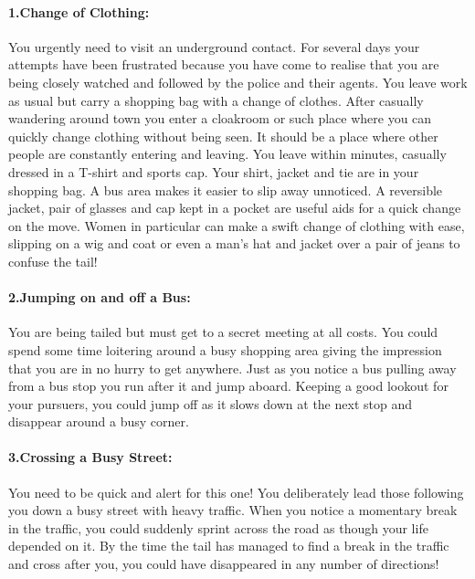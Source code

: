 \paragraph{1.Change of Clothing:}

You urgently need to visit an underground contact. For several days your
attempts have been frustrated because you have come to realise that you
are being closely watched and followed by the police and their agents.
You leave work as usual but carry a shopping bag with a change of
clothes. After casually wandering around town you enter a cloakroom or
such place where you can quickly change clothing without being seen. It
should be a place where other people are constantly entering and
leaving. You leave within minutes, casually dressed in a T-shirt and
sports cap. Your shirt, jacket and tie are in your shopping bag. A bus
area makes it easier to slip away unnoticed. A reversible jacket, pair
of glasses and cap kept in a pocket are useful aids for a quick change
on the move. Women in particular can make a swift change of clothing
with ease, slipping on a wig and coat or even a man's hat and jacket
over a pair of jeans to confuse the tail!

\paragraph{2.Jumping on and off a Bus:}

You are being tailed but must get to a secret meeting at all costs. You
could spend some time loitering around a busy shopping area giving the
impression that you are in no hurry to get anywhere. Just as you notice
a bus pulling away from a bus stop you run after it and jump aboard.
Keeping a good lookout for your pursuers, you could jump off as it slows
down at the next stop and disappear around a busy corner.

\paragraph{3.Crossing a Busy Street:}

You need to be quick and alert for this one! You deliberately lead those
following you down a busy street with heavy traffic. When you notice a
momentary break in the traffic, you could suddenly sprint across the
road as though your life depended on it. By the time the tail has
managed to find a break in the traffic and cross after you, you could
have disappeared in any number of directions!

